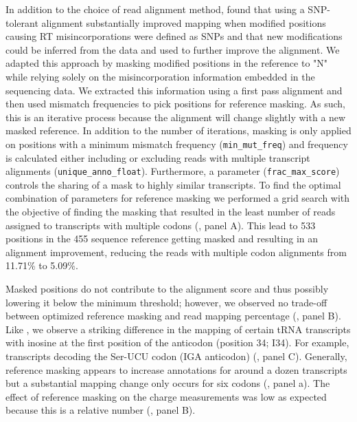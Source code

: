 \documentclass[9pt,lineno]{elife}
\begin{document}
In addition to the choice of read alignment method, \cite{Behrens2021-gb} found that using a SNP-tolerant alignment substantially improved mapping when modified positions causing RT misincorporations were defined as SNPs and that new modifications could be inferred from the data and used to further improve the alignment.
We adapted this approach by masking modified positions in the reference to "N" while relying solely on the misincorporation information embedded in the sequencing data. We extracted this information using a first pass alignment and then used mismatch frequencies to pick positions for reference masking.
As such, this is an iterative process because the alignment will change slightly with a new masked reference.
In addition to the number of iterations, masking is only applied on positions with a minimum mismatch frequency (\verb|min_mut_freq|) and frequency is calculated either including or excluding reads with multiple transcript alignments (\verb|unique_anno_float|).
Furthermore, a parameter (\verb|frac_max_score|) controls the sharing of a mask to  highly similar transcripts.
To find the optimal combination of parameters for reference masking we performed a grid search with the objective of finding the masking that resulted in the least number of reads assigned to transcripts with multiple codons (, panel A).
This lead to 533 positions in the 455 sequence reference getting masked and resulting in an alignment improvement, reducing the reads with multiple codon alignments from 11.71\% to 5.09\%.

Masked positions do not contribute to the alignment score and thus possibly lowering it below the minimum threshold; however, we observed no trade-off between optimized reference masking and read mapping percentage (, panel B).
Like \cite{Behrens2021-gb}, we observe a striking difference in the mapping of certain tRNA transcripts with inosine at the first position of the anticodon (position 34; I34).
For example, transcripts decoding the Ser-UCU codon (IGA anticodon) (, panel C).
Generally, reference masking appears to increase annotations for around a dozen transcripts but a substantial mapping change only occurs for six codons (, panel a).
The effect of reference masking on the charge measurements was low as expected because this is a relative number (, panel B).
\end{document}
